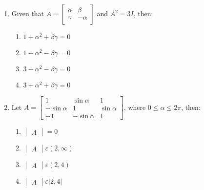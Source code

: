 \documentclass{article}
\newcommand{\myvec}[1]{\begin{bmatrix}#1\end{bmatrix}}
\newcommand{\mydet}[1]{\begin{vmatrix}#1\end{vmatrix}}
\begin{document}
\begin{enumerate}
    \item Given that $A = 
        \myvec{\alpha & \beta \\ \gamma & -\alpha}$ and $A^2 = 3I$, then:
    \begin{enumerate}
        \item $1 + \alpha^2 + \beta\gamma = 0$
        \item $1 - \alpha^2 - \beta\gamma = 0$
        \item $3 - \alpha^2 - \beta\gamma = 0$
        \item $3 + \alpha^2 + \beta\gamma = 0$
    \end{enumerate}
    \item Let $A = \myvec{1 & \sin\alpha & 1 \\ -\sin\alpha & 1 & \sin\alpha \\ -1 & -\sin\alpha & 1}$, where $0\leq \alpha \leq 2\pi$, then:
    \begin{enumerate}
	    \item $\mydet{A}=0$
	    \item $\mydet{A} \varepsilon (2,\infty)$
	    \item $\mydet{A} \varepsilon (2,4)$
	    \item $\mydet{A} \varepsilon |2,4|$
    \end{enumerate}
\end{enumerate}
\end{document}
